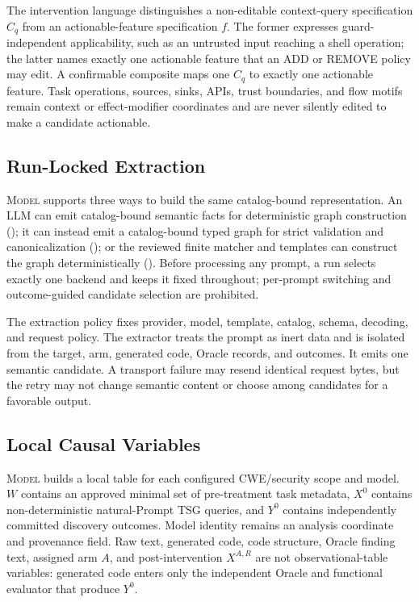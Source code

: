\documentclass[acmsmall,screen,review,anonymous]{acmart}
\newcommand{\model}{\textsc{Model}\xspace}
\begin{document}
The intervention language distinguishes a non-editable context-query
specification $C_q$ from an actionable-feature specification $f$.
The former expresses guard-independent applicability, such as an untrusted
input reaching a shell operation; the latter names exactly one actionable
feature that an ADD or REMOVE policy may edit. A confirmable composite maps one
$C_q$ to exactly one actionable feature. Task operations, sources, sinks, APIs,
trust boundaries, and flow motifs remain context or effect-modifier
coordinates and are never silently edited to make a candidate actionable.

\subsection{Run-Locked Extraction}

\model supports three ways to build the same catalog-bound representation. An
LLM can emit catalog-bound semantic facts for deterministic graph construction
(); it can instead emit a catalog-bound typed graph for
strict validation and canonicalization
(); or the reviewed finite matcher and templates
can construct the graph deterministically
(). Before processing any prompt, a run
selects exactly one backend and keeps it fixed throughout; per-prompt switching
and outcome-guided candidate selection are prohibited.

The extraction policy fixes provider, model, template, catalog, schema,
decoding, and request policy. The extractor treats the prompt as inert data and
is isolated from the target, arm, generated code, Oracle records, and outcomes.
It emits one semantic candidate. A transport failure may resend identical
request bytes, but the retry may not change semantic content or choose among
candidates for a favorable output.

\subsection{Local Causal Variables}

\model builds a local table for each configured CWE/security scope and model.
$W$ contains an approved minimal set of pre-treatment task metadata, $X^0$
contains non-deterministic natural-Prompt TSG queries, and $Y^0$ contains
independently committed discovery outcomes. Model identity remains an analysis
coordinate and provenance field. Raw text, generated code, code structure,
Oracle finding text, assigned arm $A$, and post-intervention $X^{A,R}$ are not
observational-table variables: generated code enters only the independent
Oracle and functional evaluator that produce $Y^0$.
\end{document}
